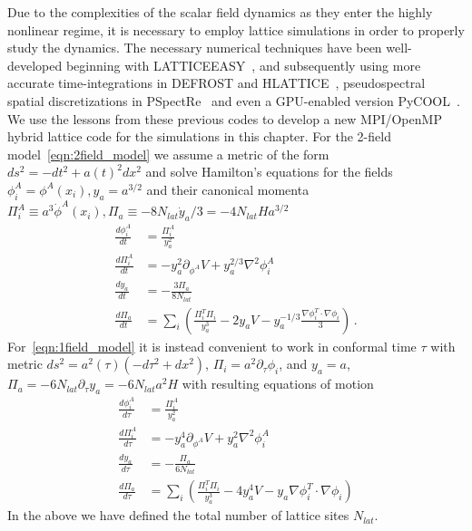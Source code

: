 \documentclass[11pt,a4paper]{article}
\begin{document}
Due to the complexities of the scalar field dynamics as they enter the highly nonlinear regime, it is necessary to employ lattice simulations in order to properly study the dynamics.
The necessary numerical techniques have been well-developed beginning with LATTICEEASY~\cite{Felder:2000hq}, and subsequently using more accurate time-integrations in DEFROST and HLATTICE~\cite{Frolov:2008hy,Huang:2011gf}, 
pseudospectral spatial discretizations in PSpectRe~\cite{Easther:2010qz} and even a GPU-enabled version PyCOOL~\cite{Sainio:2012mw}.
We use the lessons from these previous codes to develop a new MPI/OpenMP hybrid lattice code for the simulations in this chapter.
For the 2-field model~\eqref{eqn:2field_model} we assume a metric of the form $ds^2=-dt^2 + a(t)^2dx^2$ and solve Hamilton's equations for the fields $\phi_i^A=\phi^A(x_i),y_a=a^{3/2}$ and their canonical momenta $\Pi_i^A \equiv a^3\dot{\phi}^A(x_i),\Pi_a \equiv -8N_{lat}\dot{y}_a/3=-4N_{lat}Ha^{3/2}$
\begin{align}
  \frac{d\phi^A_i}{dt} &= \frac{\Pi^A_i}{y_a^2}  \\
  \frac{d\Pi^A_i}{dt} &= -y_a^2\partial_{\phi^A}V + y_a^{2/3}\nabla^2\phi_i^A \\
  \frac{d y_a}{dt} &= -\frac{3\Pi_a}{8N_{lat}} \\
  \frac{d\Pi_a}{dt} &= \sum_i \left(\frac{\Pi_i^T\Pi_i}{y_a^3} - 2y_aV - y_a^{-1/3}\frac{\nabla\phi_i^T\cdot\nabla\phi_i}{3}\right) \, .
\end{align}
For~\eqref{eqn:1field_model} it is instead convenient to work in conformal time $\tau$ with metric $ds^2= a^2(\tau)\left(-d\tau^2 + dx^2\right)$, $\Pi_i = a^2\partial_\tau\phi_i$, and $y_a=a$, $\Pi_a = -6N_{lat}\partial_\tau y_a = -6N_{lat}a^2H$ with resulting equations of motion
\begin{align}
  \frac{d\phi_i^A}{d\tau} &= \frac{\Pi_i^A}{y_a^2} \\
  \frac{d\Pi_i^A}{d\tau} &= -y_a^4\partial_{\phi^A}V + y_a^2\nabla^2\phi^A_i \\
  \frac{d y_a}{d\tau} &= -\frac{\Pi_a}{6N_{lat}} \\
  \frac{d \Pi_a}{d\tau} &= \sum_{i} \left(\frac{\Pi_i^T\Pi_i}{y_a^3} - 4y_a^4V - y_a\nabla\phi_i^T\cdot\nabla\phi_i\right)
\end{align}
In the above we have defined the total number of lattice sites $N_{lat}$.
\end{document}
